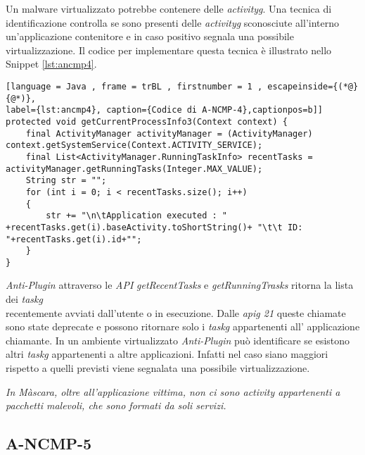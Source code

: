 Un malware virtualizzato potrebbe contenere delle \emph{\gls{activityg}}. Una tecnica di identificazione controlla se sono presenti delle \emph{\gls{activityg}} sconosciute all'interno un'applicazione contenitore e in caso positivo segnala una possibile virtualizzazione. Il codice per implementare questa tecnica è illustrato nello Snippet \ref{lst:ancmp4}.

\begin{lstlisting}[language = Java , frame = trBL , firstnumber = 1 , escapeinside={(*@}{@*)},
label={lst:ancmp4}, caption={Codice di A-NCMP-4},captionpos=b]]
protected void getCurrentProcessInfo3(Context context) {
    final ActivityManager activityManager = (ActivityManager) context.getSystemService(Context.ACTIVITY_SERVICE);
    final List<ActivityManager.RunningTaskInfo> recentTasks = activityManager.getRunningTasks(Integer.MAX_VALUE);
    String str = "";
    for (int i = 0; i < recentTasks.size(); i++)
    {
        str += "\n\tApplication executed : " +recentTasks.get(i).baseActivity.toShortString()+ "\t\t ID: "+recentTasks.get(i).id+"";
    }
}

\end{lstlisting}

\emph{Anti-Plugin} attraverso le \emph{API} \emph{getRecentTasks} e \emph{getRunningTrasks} ritorna la lista dei \emph{\gls{taskg}}\glsfirstoccurspace\\ recentemente avviati dall'utente o in esecuzione. Dalle \emph{\gls{apig} 21} queste chiamate sono state deprecate e possono ritornare solo i \emph{\gls{taskg}} appartenenti all' applicazione chiamante. In un ambiente virtualizzato \emph{Anti-Plugin} può identificare se esistono altri \emph{\gls{taskg}} appartenenti a altre applicazioni.
Infatti nel caso siano maggiori rispetto a quelli previsti viene segnalata una possibile virtualizzazione.

\emph{In Màscara, oltre all'applicazione vittima, non ci sono activity appartenenti a pacchetti malevoli, che sono formati da soli servizi.}


\newpage
\subsection*{A-NCMP-5}
\label{a-ncmp-5}

